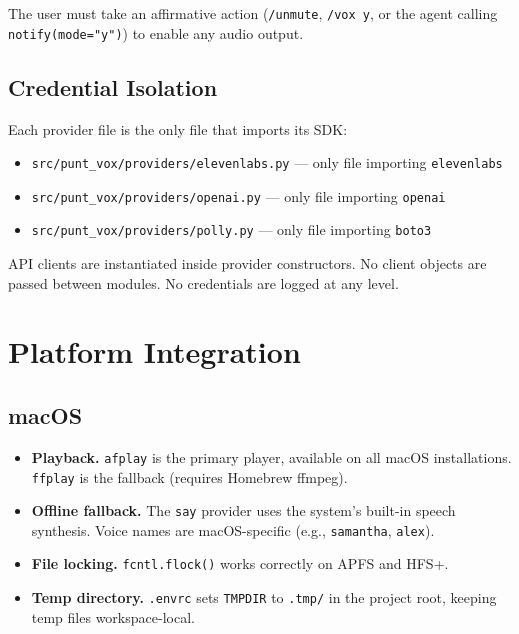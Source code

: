 \documentclass[a4paper,10pt]{article}
\newcommand{\modpath}[1]{\texttt{src/punt\_vox/#1}}
\newcommand{\tool}[1]{\texttt{#1}}
\newcommand{\cmd}[1]{\texttt{/#1}}
\begin{document}
The user must take an affirmative action (\cmd{unmute},
\cmd{vox~y}, or the agent calling \tool{notify(mode="y")}) to
enable any audio output.

\subsection{Credential Isolation}

Each provider file is the only file that imports its SDK:

\begin{itemize}
  \item \modpath{providers/elevenlabs.py} --- only file importing
    \texttt{elevenlabs}
  \item \modpath{providers/openai.py} --- only file importing
    \texttt{openai}
  \item \modpath{providers/polly.py} --- only file importing
    \texttt{boto3}
\end{itemize}

API clients are instantiated inside provider constructors.  No
client objects are passed between modules.  No credentials are
logged at any level.


\section{Platform Integration}

\subsection{macOS}

\begin{itemize}
  \item \textbf{Playback.}  \texttt{afplay} is the primary
    player, available on all macOS installations.
    \texttt{ffplay} is the fallback (requires Homebrew ffmpeg).
  \item \textbf{Offline fallback.}  The \texttt{say} provider
    uses the system's built-in speech synthesis.  Voice names
    are macOS-specific (e.g., \texttt{samantha}, \texttt{alex}).
  \item \textbf{File locking.}  \texttt{fcntl.flock()} works
    correctly on APFS and HFS+.
  \item \textbf{Temp directory.}  \texttt{.envrc} sets
    \texttt{TMPDIR} to \texttt{.tmp/} in the project root,
    keeping temp files workspace-local.
\end{itemize}
\end{document}
